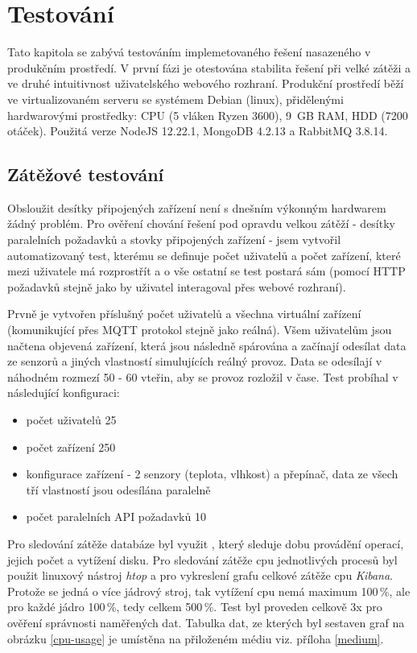 \chapter{Testování}
Tato kapitola se zabývá testováním implemetovaného řešení nasazeného v produkčním prostředí. V první fázi je otestována stabilita řešení při velké zátěži a ve druhé intuitivnost uživatelského webového rozhraní. Produkční prostředí běží ve virtualizovaném serveru se systémem Debian (linux), přidělenými hardwarovými prostředky: CPU (5 vláken Ryzen 3600), 9~GB RAM, HDD (7200 otáček). Použitá verze NodeJS 12.22.1, MongoDB 4.2.13 a RabbitMQ 3.8.14.

\section{Zátěžové testování}
Obsloužit desítky připojených zařízení není s dnešním výkonným hardwarem žádný problém. Pro ověření chování řešení pod opravdu velkou zátěží - desítky paralelních požadavků a stovky připojených zařízení - jsem vytvořil automatizovaný test, kterému se definuje počet uživatelů a počet zařízení, které mezi uživatele má rozprostřít a o vše ostatní se test postará sám (pomocí HTTP požadavků stejně jako by uživatel interagoval přes webové rozhraní).

Prvně je vytvořen příslušný počet uživatelů a všechna virtuální zařízení (komunikující přes MQTT protokol stejně jako reálná). Všem uživatelům jsou načtena objevená zařízení, která jsou následně spárována a začínají odesílat data ze senzorů a jiných vlastností simulujících reálný provoz. Data se odesílají v náhodném rozmezí 50 - 60 vteřin, aby se provoz rozložil v čase. Test probíhal v následující konfiguraci:
\begin{itemize}
    \item počet uživatelů 25
    \item počet zařízení 250
    \item konfigurace zařízení - 2 senzory (teplota, vlhkost) a přepínač, data ze všech tří vlastností jsou odesílána paralelně
    \item počet paralelních API požadavků 10
\end{itemize}
Pro sledování zátěže databáze byl využit  \cite{free-monitoring}, který sleduje dobu provádění operací, jejich počet a vytížení disku. Pro sledování zátěže cpu jednotlivých procesů byl použit linuxový nástroj \textit{htop} a pro vykreslení grafu celkové zátěže cpu \textit{Kibana}. Protože se jedná o více jádrový stroj, tak vytížení cpu nemá maximum 100\,\%, ale pro každé jádro 100\,\%, tedy celkem 500\,\%. Test byl proveden celkově 3x pro ověření správnosti naměřených dat. Tabulka dat, ze kterých byl sestaven graf na obrázku \ref{cpu-usage} je umístěna na přiloženém médiu viz. příloha \ref{medium}.

